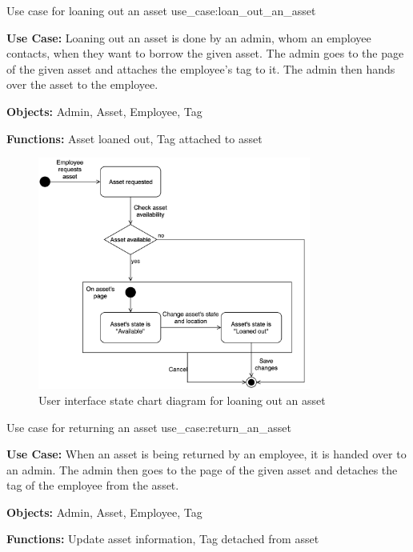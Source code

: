 \newpage

    {Use case for loaning out an asset}
    {use_case:loan_out_an_asset}
    {
        \textbf{Use Case:} Loaning out an asset is done by an admin, whom an employee contacts, when they want to borrow the given asset. The admin goes to the page of the given asset and attaches the employee's tag to it. The admin then hands over the asset to the employee.
    
        \vskip 0.2cm
        
        \textbf{Objects:} Admin, Asset, Employee, Tag
        
        \vskip 0.2cm
        
        \textbf{Functions:} Asset loaned out, Tag attached to asset
    }
 
\begin{figure}[H]
    \centering
    \includegraphics[width=0.8\textwidth]{figures/UseCases/UC_Loan_out_asset.png}
    \caption{User interface state chart diagram for loaning out an asset}
    \label{fig:loan_out_asse_statechart}
\end{figure}
 
    {Use case for returning an asset}
    {use_case:return_an_asset}
    {
        \textbf{Use Case:} When an asset is being returned by an employee, it is handed over to an admin. The admin then goes to the page of the given asset and detaches the tag of the employee from the asset.
    
        \vskip 0.2cm
        
        \textbf{Objects:} Admin, Asset, Employee, Tag
        
        \vskip 0.2cm
        
        \textbf{Functions:} Update asset information, Tag detached from asset
    }
    
